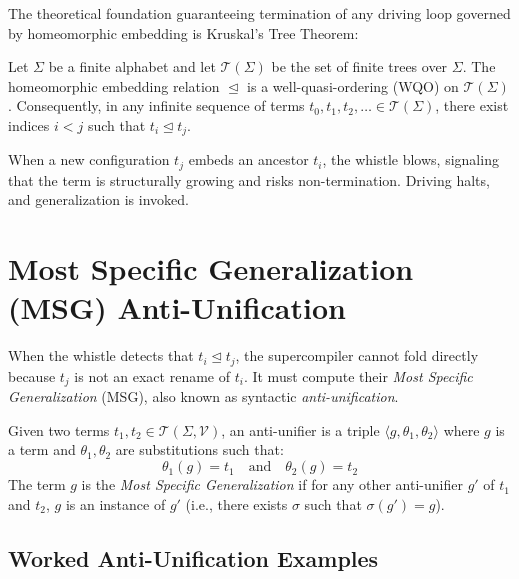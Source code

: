 The theoretical foundation guaranteeing termination of any driving loop governed by homeomorphic embedding is Kruskal's Tree Theorem:

\begin{theorem}
Let $\Sigma$ be a finite alphabet and let $\mathcal{T}(\Sigma)$ be the set of finite trees over $\Sigma$. The homeomorphic embedding relation $\trianglelefteq$ is a well-quasi-ordering (WQO) on $\mathcal{T}(\Sigma)$. Consequently, in any infinite sequence of terms $t_0, t_1, t_2, \dots \in \mathcal{T}(\Sigma)$, there exist indices $i < j$ such that $t_i \trianglelefteq t_j$.
\end{theorem}

When a new configuration $t_j$ embeds an ancestor $t_i$, the whistle blows, signaling that the term is structurally growing and risks non-termination. Driving halts, and generalization is invoked.

\section{Most Specific Generalization (MSG) Anti-Unification}
\label{sec:background:msg}

When the whistle detects that $t_i \trianglelefteq t_j$, the supercompiler cannot fold directly because $t_j$ is not an exact rename of $t_i$. It must compute their \emph{Most Specific Generalization} (MSG), also known as syntactic \emph{anti-unification}.

\begin{definition}
Given two terms $t_1, t_2 \in \mathcal{T}(\Sigma, \mathcal{V})$, an anti-unifier is a triple $\langle g, \theta_1, \theta_2 \rangle$ where $g$ is a term and $\theta_1, \theta_2$ are substitutions such that:
\begin{equation}
\theta_1(g) = t_1 \quad \text{and} \quad \theta_2(g) = t_2
\end{equation}
The term $g$ is the \emph{Most Specific Generalization} if for any other anti-unifier $g'$ of $t_1$ and $t_2$, $g$ is an instance of $g'$ (i.e., there exists $\sigma$ such that $\sigma(g') = g$).
\end{definition}

\subsection{Worked Anti-Unification Examples}

